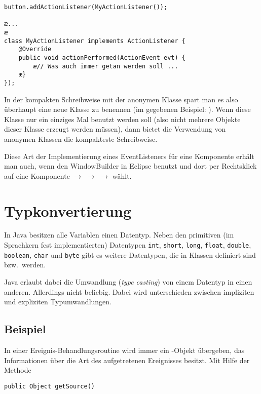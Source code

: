 \begin{compactenum}[1.]
\begin{lstlisting}
button.addActionListener(MyActionListener());
   		
æ...
æ   		
class MyActionListener implements ActionListener {
    @Override
    public void actionPerformed(ActionEvent evt) {
        æ// Was auch immer getan werden soll ...
    æ}
});
\end{lstlisting}

In der kompakten Schreibweise mit der anonymen Klasse spart man es also überhaupt 
eine neue Klasse zu benennen (im gegebenen Beispiel:
). Wenn diese Klasse nur ein einziges Mal benutzt
werden soll (also nicht mehrere Objekte dieser Klasse erzeugt werden müssen),
dann bietet die Verwendung von anonymen Klassen die kompakteste Schreibweise.

Diese Art der Implementierung eines EventListeners für eine Komponente erhält
man auch, wenn den WindowBuilder in Eclipse benutzt und dort per Rechtsklick
auf eine Komponente $\rightarrow$  $\rightarrow$
 $\rightarrow$  wählt.
\end{compactenum}


\section{Typkonvertierung}

In Java besitzen alle Variablen einen Datentyp. Neben den primitiven (im
Sprachkern fest implementierten) Datentypen \lstinline|int|, \lstinline|short|,
\lstinline|long|, \lstinline|float|, \lstinline|double|, \lstinline|boolean|,
\lstinline|char| und \lstinline|byte| gibt es weitere Datentypen, die in Klassen
definiert sind bzw.\ werden.

Java erlaubt dabei die Umwandlung (\emph{type casting}) von einem Datentyp in
einen anderen. Allerdings nicht beliebig. Dabei wird unterschieden zwischen
impliziten und expliziten Typumwandlungen.

\subsection{Beispiel}

In einer Ereignis-Behandlungsroutine wird immer ein -Objekt
übergeben, das Informationen über die Art des aufgetretenen Ereignisses
besitzt. Mit Hilfe der Methode

\begin{lstlisting}
public Object getSource()
\end{lstlisting}

